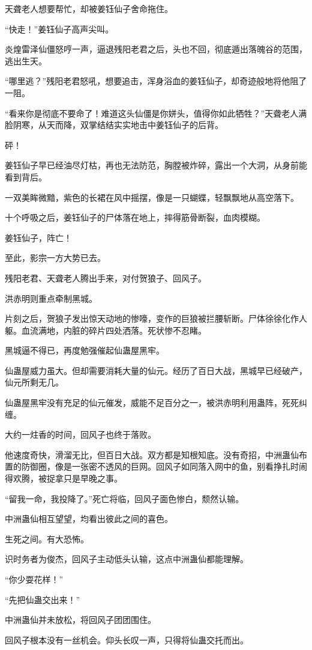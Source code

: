 \begin{this_body}
天聋老人想要帮忙，却被姜钰仙子舍命拖住。

“快走！”姜钰仙子高声尖叫。

炎煌雷泽仙僵怒哼一声，逼退残阳老君之后，头也不回，彻底遁出落魄谷的范围，逃出生天。

“哪里逃？”残阳老君怒吼，想要追击，浑身浴血的姜钰仙子，却奇迹般地将他阻了一阻。

“看来你是彻底不要命了！难道这头仙僵是你姘头，值得你如此牺牲？”天聋老人满脸阴寒，从天而降，双掌结结实实地击中姜钰仙子的后背。

砰！

姜钰仙子早已经油尽灯枯，再也无法防范，胸膛被炸碎，露出一个大洞，从身前能看到背后。

一双美眸微黯，紫色的长裙在风中摇摆，像是一只蝴蝶，轻飘飘地从高空落下。

十个呼吸之后，姜钰仙子的尸体落在地上，摔得筋骨断裂，血肉模糊。

姜钰仙子，阵亡！

至此，影宗一方大势已去。

残阳老君、天聋老人腾出手来，对付贺狼子、回风子。

洪赤明则重点牵制黑城。

片刻之后，贺狼子发出惊天动地的惨嚎，变作的巨狼被拦腰斩断。尸体徐徐化作人躯。血流满地，内脏的碎片四处洒落。死状惨不忍睹。

黑城逼不得已，再度勉强催起仙蛊屋黑牢。

仙蛊屋威力虽大。但却需要消耗大量的仙元。经历了百日大战，黑城早已经破产，仙元所剩无几。

仙蛊屋黑牢没有充足的仙元催发，威能不足百分之一，被洪赤明利用蛊阵，死死纠缠。

大约一炷香的时间，回风子也终于落败。

他速度奇快，滑溜无比，但百日大战。双方都是知根知底。没有奇招，中洲蛊仙布置的防御圈，像是一张密不透风的巨网。回风子如同落入网中的鱼，别看挣扎时闹得欢腾，被捉拿只是早晚之事。

“留我一命，我投降了。”死亡将临，回风子面色惨白，颓然认输。

中洲蛊仙相互望望，均看出彼此之间的喜色。

生死之间。有大恐怖。

识时务者为俊杰，回风子主动低头认输，这点中洲蛊仙都能理解。

“你少耍花样！”

“先把仙蛊交出来！”

中洲蛊仙并未放松，将回风子团团围住。

回风子根本没有一丝机会。仰头长叹一声，只得将仙蛊交托而出。


\end{this_body}
